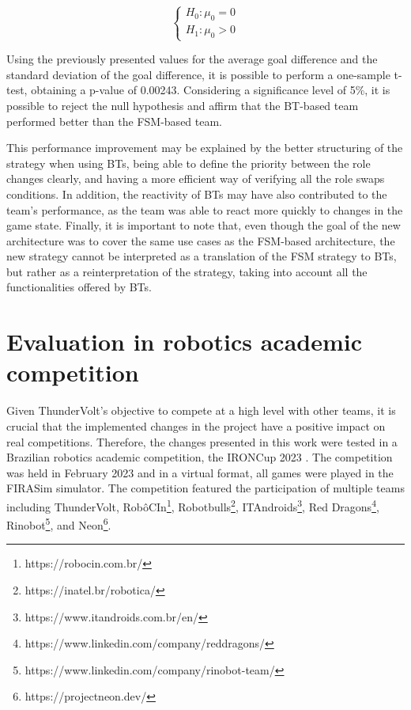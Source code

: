 \begin{equation}
    \left\{
    \begin{aligned}
        H_0: \mu_0 = 0 \\
        H_1: \mu_0 > 0
    \end{aligned}
    \right.
    \label{eq:average_goals_diff_hypothesis}
\end{equation}

Using the previously presented values for the average goal difference and the standard deviation of the goal difference, it is possible to perform a one-sample t-test, obtaining a p-value of 0.00243. Considering a significance level of 5\%, it is possible to reject the null hypothesis and affirm that the BT-based team performed better than the FSM-based team.

This performance improvement may be explained by the better structuring of the strategy when using BTs, being able to define the priority between the role changes clearly, and having a more efficient way of verifying all the role swaps conditions. In addition, the reactivity of BTs may have also contributed to the team's performance, as the team was able to react more quickly to changes in the game state. Finally, it is important to note that, even though the goal of the new architecture was to cover the same use cases as the FSM-based architecture, the new strategy cannot be interpreted as a translation of the FSM strategy to BTs, but rather as a reinterpretation of the strategy, taking into account all the functionalities offered by BTs.

\section{Evaluation in robotics academic competition}

Given ThunderVolt's objective to compete at a high level with other teams, it is crucial that the implemented changes in the project have a positive impact on real competitions. Therefore, the changes presented in this work were tested in a Brazilian robotics academic competition, the IRONCup 2023 \cite{IRONCup2023}. The competition was held in February 2023 and in a virtual format, all games were played in the FIRASim simulator. The competition featured the participation of multiple teams including ThunderVolt, RobôCIn\footnote{https://robocin.com.br/}, Robotbulls\footnote{https://inatel.br/robotica/}, ITAndroids\footnote{https://www.itandroids.com.br/en/}, Red Dragons\footnote{https://www.linkedin.com/company/reddragons/}, Rinobot\footnote{https://www.linkedin.com/company/rinobot-team/}, and Neon\footnote{https://projectneon.dev/}.

